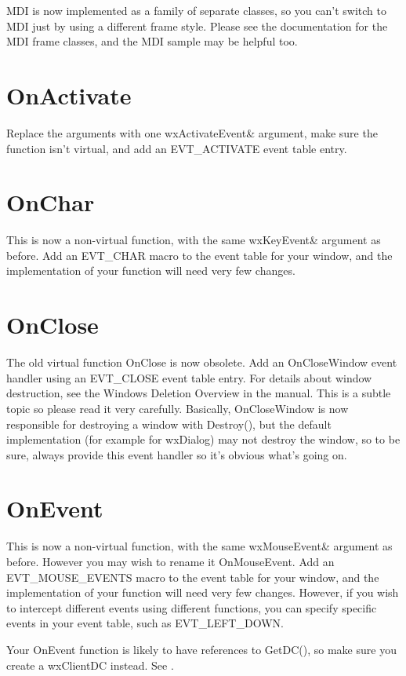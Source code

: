 MDI is now implemented as a family of separate classes, so you can't switch to MDI just by
using a different frame style. Please see the documentation for the MDI frame classes, and the MDI
sample may be helpful too.

\section{OnActivate}

Replace the arguments with one wxActivateEvent\& argument, make sure the function isn't virtual,
and add an EVT\_ACTIVATE event table entry.

\section{OnChar}

This is now a non-virtual function, with the same wxKeyEvent\& argument as before.
Add an EVT\_CHAR macro to the event table
for your window, and the implementation of your function will need very few changes.

\section{OnClose}

The old virtual function OnClose is now obsolete.
Add an OnCloseWindow event handler using an EVT\_CLOSE event table entry. For details
about window destruction, see the Windows Deletion Overview in the manual. This is a subtle
topic so please read it very carefully. Basically, OnCloseWindow is now responsible for
destroying a window with Destroy(), but the default implementation (for example for wxDialog) may not
destroy the window, so to be sure, always provide this event handler so it's obvious what's going on.

\section{OnEvent}

This is now a non-virtual function, with the same wxMouseEvent\& argument as before. However
you may wish to rename it OnMouseEvent. Add an EVT\_MOUSE\_EVENTS macro to the event table
for your window, and the implementation of your function will need very few changes.
However, if you wish to intercept different events using different functions, you can
specify specific events in your event table, such as EVT\_LEFT\_DOWN.

Your OnEvent function is likely to have references to GetDC(), so make sure you create
a wxClientDC instead. See .

